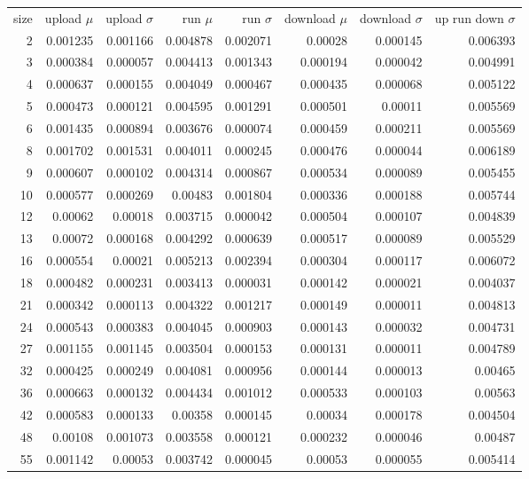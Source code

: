 \begin{longtable}{r r r r r r r r}
size & upload $\mu$  & upload $\sigma$ & run $\mu$ & run $\sigma$ & download $\mu$ & download $\sigma$ & up run down $\sigma$ \\
2 & 0.001235 & 0.001166 & 0.004878 & 0.002071 & 0.00028 & 0.000145 & 0.006393 \\
3 & 0.000384 & 0.000057 & 0.004413 & 0.001343 & 0.000194 & 0.000042 & 0.004991 \\
4 & 0.000637 & 0.000155 & 0.004049 & 0.000467 & 0.000435 & 0.000068 & 0.005122 \\
5 & 0.000473 & 0.000121 & 0.004595 & 0.001291 & 0.000501 & 0.00011 & 0.005569 \\
6 & 0.001435 & 0.000894 & 0.003676 & 0.000074 & 0.000459 & 0.000211 & 0.005569 \\
8 & 0.001702 & 0.001531 & 0.004011 & 0.000245 & 0.000476 & 0.000044 & 0.006189 \\
9 & 0.000607 & 0.000102 & 0.004314 & 0.000867 & 0.000534 & 0.000089 & 0.005455 \\
10 & 0.000577 & 0.000269 & 0.00483 & 0.001804 & 0.000336 & 0.000188 & 0.005744 \\
12 & 0.00062 & 0.00018 & 0.003715 & 0.000042 & 0.000504 & 0.000107 & 0.004839 \\
13 & 0.00072 & 0.000168 & 0.004292 & 0.000639 & 0.000517 & 0.000089 & 0.005529 \\
16 & 0.000554 & 0.00021 & 0.005213 & 0.002394 & 0.000304 & 0.000117 & 0.006072 \\
18 & 0.000482 & 0.000231 & 0.003413 & 0.000031 & 0.000142 & 0.000021 & 0.004037 \\
21 & 0.000342 & 0.000113 & 0.004322 & 0.001217 & 0.000149 & 0.000011 & 0.004813 \\
24 & 0.000543 & 0.000383 & 0.004045 & 0.000903 & 0.000143 & 0.000032 & 0.004731 \\
27 & 0.001155 & 0.001145 & 0.003504 & 0.000153 & 0.000131 & 0.000011 & 0.004789 \\
32 & 0.000425 & 0.000249 & 0.004081 & 0.000956 & 0.000144 & 0.000013 & 0.00465 \\
36 & 0.000663 & 0.000132 & 0.004434 & 0.001012 & 0.000533 & 0.000103 & 0.00563 \\
42 & 0.000583 & 0.000133 & 0.00358 & 0.000145 & 0.00034 & 0.000178 & 0.004504 \\
48 & 0.00108 & 0.001073 & 0.003558 & 0.000121 & 0.000232 & 0.000046 & 0.00487 \\
55 & 0.001142 & 0.00053 & 0.003742 & 0.000045 & 0.00053 & 0.000055 & 0.005414 \\

\end{longtable}
